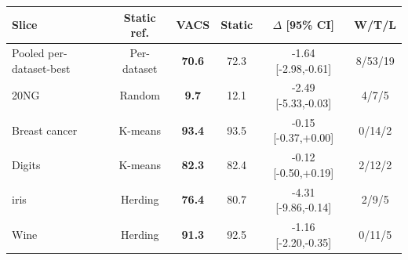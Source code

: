 \begin{tabular}{lccccc}
\toprule
Slice & Static ref. & VACS & Static & $\Delta$ [95\% CI] & W/T/L \\
\midrule
Pooled per-dataset-best & Per-dataset & \textbf{70.6} & 72.3 & -1.64 [-2.98,-0.61] & 8/53/19 \\
20NG & Random & \textbf{9.7} & 12.1 & -2.49 [-5.33,-0.03] & 4/7/5 \\
Breast cancer & K-means & \textbf{93.4} & 93.5 & -0.15 [-0.37,+0.00] & 0/14/2 \\
Digits & K-means & \textbf{82.3} & 82.4 & -0.12 [-0.50,+0.19] & 2/12/2 \\
iris & Herding & \textbf{76.4} & 80.7 & -4.31 [-9.86,-0.14] & 2/9/5 \\
Wine & Herding & \textbf{91.3} & 92.5 & -1.16 [-2.20,-0.35] & 0/11/5 \\
\bottomrule
\end{tabular}
